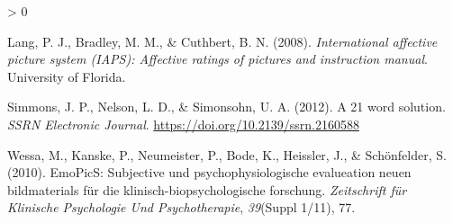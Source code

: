 \documentclass[
]{article}
\newlength{\cslhangindent}
\newenvironment{CSLReferences}[2] %
 {%
  \setlength{\parindent}{0pt}
  \ifodd #1 \everypar{\setlength{\hangindent}{\cslhangindent}}\ignorespaces\fi
  \ifnum #2 > 0
  \setlength{\parskip}{#2\baselineskip}
  \fi
 }%
 {}
\begin{document}
\hypertarget{refs}{}
\begin{CSLReferences}{1}{0}
\leavevmode\hypertarget{ref-Lang2008}{}%
Lang, P. J., Bradley, M. M., \& Cuthbert, B. N. (2008).
\emph{International affective picture system (IAPS): Affective ratings
of pictures and instruction manual}. University of Florida.

\leavevmode\hypertarget{ref-Simmons2012}{}%
Simmons, J. P., Nelson, L. D., \& Simonsohn, U. A. (2012). A 21 word
solution. \emph{SSRN Electronic Journal}.
\url{https://doi.org/10.2139/ssrn.2160588}

\leavevmode\hypertarget{ref-Wessa2010}{}%
Wessa, M., Kanske, P., Neumeister, P., Bode, K., Heissler, J., \&
Schönfelder, S. (2010). EmoPicS: Subjective und psychophysiologische
evalueation neuen bildmaterials für die klinisch-biopsychologische
forschung. \emph{Zeitschrift für Klinische Psychologie Und
Psychotherapie}, \emph{39}(Suppl 1/11), 77.

\end{CSLReferences}
\end{document}
